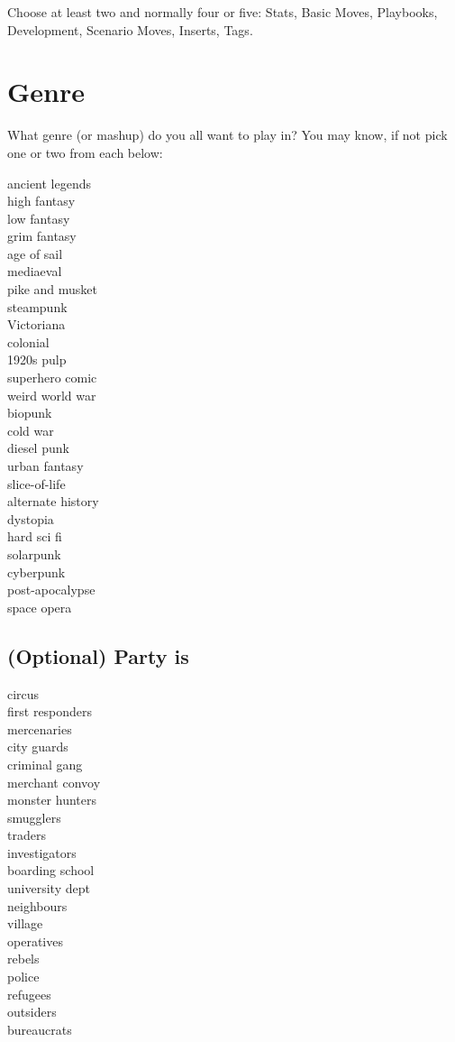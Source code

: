 \documentclass{tufte-handout}
\begin{document}
Choose at least two and normally four or five:
Stats, Basic Moves, Playbooks, Development, Scenario Moves, Inserts, Tags.

\section{Genre}
What genre (or mashup) do you all want to play in?
You may know, if not pick one or two from each below:
\begin{multicols}{3}
ancient legends\\
high fantasy\\
low fantasy\\
grim fantasy\\
age of sail\\
mediaeval\\
pike and musket\\
steampunk\\
Victoriana\\
colonial\\
1920s pulp\\
superhero comic\\
weird world war\\
biopunk\\
cold war\\
diesel punk\\
urban fantasy\\
slice-of-life\\
alternate history\\
dystopia\\
hard sci fi\\
solarpunk\\
cyberpunk\\
post-apocalypse\\
space opera\\
\end{multicols}

\subsection{(Optional) Party is}
\begin{multicols}{3}
circus\\
first responders\\
mercenaries\\
city guards\\
criminal gang\\
merchant convoy\\
monster hunters\\
smugglers\\
traders\\
investigators\\
boarding school\\
university dept\\
neighbours\\
village\\
operatives\\
rebels\\
police\\
refugees\\
outsiders\\
bureaucrats\\
\end{multicols}
\end{document}
